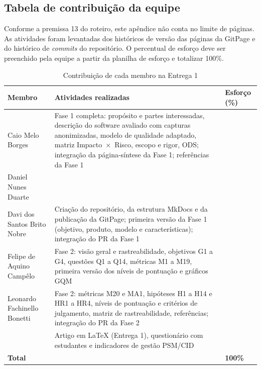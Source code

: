 \begin{apendicesenv}

\chapter{Tabela de contribuição da equipe}
\label{ap:contribuicao}

Conforme a premissa 13 do roteiro, este apêndice não conta no limite de páginas. As atividades foram levantadas dos históricos de versão das páginas da GitPage e do histórico de \textit{commits} do repositório. O percentual de esforço deve ser preenchido pela equipe a partir da planilha de esforço e totalizar 100\%.

\begin{table}[htb]
	\caption{Contribuição de cada membro na Entrega 1}
	\label{tab:contribuicao}
	\centering
	\scriptsize
	\begin{tabularx}{\textwidth}{L{3.3cm} Y C{1.6cm}}
		\toprule
		\textbf{Membro} & \textbf{Atividades realizadas} & \textbf{Esforço (\%)} \\
		\midrule
		Caio Melo Borges & Fase 1 completa: propósito e partes interessadas, descrição do software avaliado com capturas anonimizadas, modelo de qualidade adaptado, matriz Impacto~$\times$~Risco, escopo e rigor, ODS; integração da página-síntese da Fase 1; referências da Fase 1 & \pendente{--} \\
		Daniel Nunes Duarte &  & \pendente{--} \\
		Davi dos Santos Brito Nobre & Criação do repositório, da estrutura MkDocs e da publicação da GitPage; primeira versão da Fase 1 (objetivo, produto, modelo e características); integração do PR da Fase 1 & \pendente{--} \\
		Felipe de Aquino Campêlo & Fase 2: visão geral e rastreabilidade, objetivos G1 a G4, questões Q1 a Q14, métricas M1 a M19, primeira versão dos níveis de pontuação e gráficos GQM & \pendente{--} \\
		Leonardo Fachinello Bonetti & Fase 2: métricas M20 e MA1, hipóteses H1 a H14 e HR1 a HR4, níveis de pontuação e critérios de julgamento, matriz de rastreabilidade, referências; integração do PR da Fase 2 & \pendente{--} \\
		 & Artigo em LaTeX (Entrega 1), questionário com estudantes e indicadores de gestão PSM/CID & \pendente{--} \\
		\midrule
		\textbf{Total} & & \textbf{100\%} \\
		\bottomrule
	\end{tabularx}
\end{table}

\end{apendicesenv}

